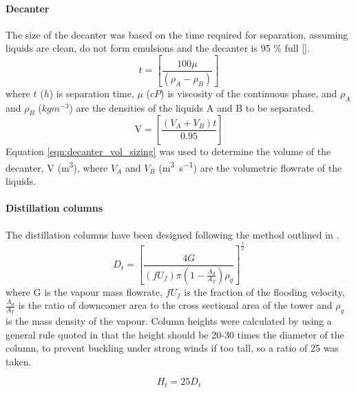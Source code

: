 \paragraph{Decanter}
The size of the decanter was based on the time required for separation, assuming liquids are clean, do not form emulsions and the decanter is 95 \% full [].  
\begin{equation}
    t = \left[\frac{100\mu}{(\rho_A - \rho_B)}\right]
    \label{eqn:decanter_time_sizing}
\end{equation}
where $t$ ($h$) is separation time, $\mu$ ($cP$) is viscosity of the continuous phase, and $\rho_A$ and $\rho_B$ ($kgm^{-3}$) are the densities of the liquids A and B to be separated. 
\begin{equation}
    \text{V} = \left[\frac{(V_A + V_B)t}{0.95}\right] 
    \label{eqn:decanter_vol_sizing}
\end{equation}
Equation \ref{eqn:decanter_vol_sizing} was used to determine the volume of the decanter, V (\si{\cubic\m}), where $V_A$ and $V_B$ (\si{\cubic\m\per\s})  are the volumetric flowrate of the liquids. 

\paragraph{Distillation columns}
The distillation columns have been designed following the method outlined in \textcite{seider_product_2009,seader_separation_2011}.
\begin{equation}
    D_t = \left[\frac{4G}{\left(fU_f\right)\pi\left(1-\frac{A_d}{A_T}\right)\rho_g}\right]^\frac{1}{2}
    \label{distill_dia_sizing}
\end{equation}
where G is the vapour mass flowrate, $fU_f$ is the fraction of the flooding velocity, $\frac{A_d}{A_T}$ is the ratio of downcomer area to the cross sectional area of the tower and $\rho_g$ is the mass density of the vapour. Column heights were calculated by using a general rule quoted in \textcite{douglas_conceptual_1988} that the height should be 20-30 times the diameter of the column, to prevent buckling under strong winds if too tall, so a ratio of 25 was taken. 

\begin{equation}
    H_t = 25D_t
    \label{distill_height_sizing}
\end{equation}

